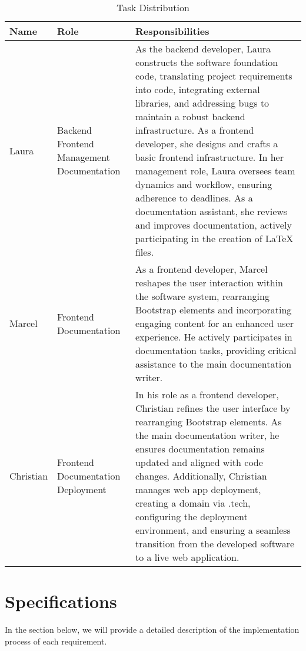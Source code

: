 \documentclass[conference]{IEEEtran}
\begin{document}
\begin{table}[H]
\centering
\begin{tabular}{| p{1cm}|p{1.5cm}|p{5cm} |}
\hline
\textbf{Name} & \textbf{Role} & \textbf{Responsibilities}\\

\hline
Laura & Backend Frontend Management Documentation & 
As the backend developer, Laura constructs the software foundation code, translating project requirements into code, integrating external libraries, and addressing bugs to maintain a robust backend infrastructure. As a frontend developer, she designs and crafts a basic frontend infrastructure. In her management role, Laura oversees team dynamics and workflow, ensuring adherence to deadlines. As a documentation assistant, she reviews and improves documentation, actively participating in the creation of LaTeX files.\\

\hline
Marcel & Frontend Documentation & 
As a frontend developer, Marcel reshapes the user interaction within the software system, rearranging Bootstrap elements and incorporating engaging content for an enhanced user experience. He actively participates in documentation tasks, providing critical assistance to the main documentation writer.\\

\hline
Christian & Frontend Documentation Deployment & 
In his role as a frontend developer, Christian refines the user interface by rearranging Bootstrap elements. As the main documentation writer, he ensures documentation remains updated and aligned with code changes. Additionally, Christian manages web app deployment, creating a domain via .tech, configuring the deployment environment, and ensuring a seamless transition from the developed software to a live web application.\\

\hline
\end{tabular}
\caption{Task Distribution}
\label{tab1}
\end{table}

\section{Specifications}
In the section below, we will provide a detailed description of the implementation process of each requirement.
\end{document}
